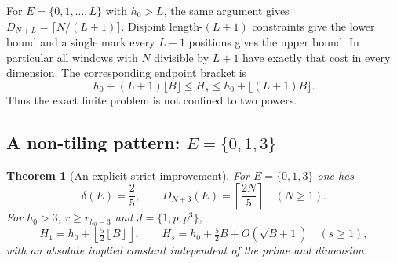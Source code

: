 \documentclass[11pt]{article}
\newtheorem{theorem}{Theorem}[section]
\theoremstyle{definition}
\newcommand{\ceil}[1]{\left\lceil #1\right\rceil}
\newcommand{\floor}[1]{\left\lfloor #1\right\rfloor}
\begin{document}
For $E=\{0,1,\ldots,L\}$ with $h_0>L$, the same argument gives $D_{N+L}=\lceil N/(L+1)\rceil$. Disjoint length-$(L+1)$ constraints give the lower bound and a single mark every $L+1$ positions gives the upper bound. In particular all windows with $N$ divisible by $L+1$ have exactly that cost in every dimension. The corresponding endpoint bracket is
\[
 h_0+(L+1)\lfloor B\rfloor\le H_s\le h_0+\lfloor(L+1)B\rfloor.
\]
Thus the exact finite problem is not confined to two powers.

\subsection{A non-tiling pattern: $E=\{0,1,3\}$}\label{sec:013}

\begin{theorem}[An explicit strict improvement]\label{thm:013}
For $E=\{0,1,3\}$ one has
\[
 \delta(E)=\frac25,\qquad D_{N+3}(E)=\ceil{\frac{2N}{5}}\quad(N\ge1).
\]
For $h_0>3$, $r\ge r_{h_0-3}$ and $J=\{1,p,p^3\}$,
\[
 H_1=h_0+\floor{\tfrac52\floor B},\qquad
 H_s=h_0+\tfrac52 B+O(\sqrt{B+1})\quad(s\ge1),
\]
with an absolute implied constant independent of the prime and dimension.
\end{theorem}
\end{document}
